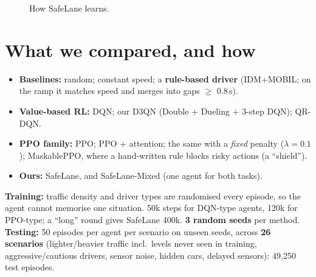\documentclass[10pt,twocolumn,a4paper]{article}
\newcommand{\term}[1]{\textbf{#1}}
\begin{document}
\begin{figure}[t]\centering
{}
\caption{How SafeLane learns.}
\label{fig:loop}
\end{figure}

\section{What we compared, and how}
\begin{itemize}
\item \term{Baselines:} random; constant speed; a \term{rule-based driver} (IDM+MOBIL; on the ramp it matches speed and merges into gaps $\ge$ 0.8\,s).
\item \term{Value-based RL:} DQN; our D3QN (Double + Dueling + 3-step DQN); QR-DQN.
\item \term{PPO family:} PPO; PPO + attention; the same with a \emph{fixed} penalty ($\lambda=0.1$); MaskablePPO, where a hand-written
rule blocks risky actions (a ``shield'').
\item \term{Ours:} SafeLane, and SafeLane-Mixed (one agent for both tasks).
\end{itemize}
\term{Training:} traffic density and driver types are randomised every episode, so the agent cannot memorise one situation.
50k steps for DQN-type agents, 120k for PPO-type; a ``long'' round gives SafeLane 400k. \term{3 random seeds} per method.
\term{Testing:} 50 episodes per agent per scenario on unseen seeds, across \term{26 scenarios} (lighter/heavier traffic incl.\ levels
never seen in training, aggressive/cautious drivers, sensor noise, hidden cars, delayed sensors): 49{,}250 test episodes.
\end{document}
